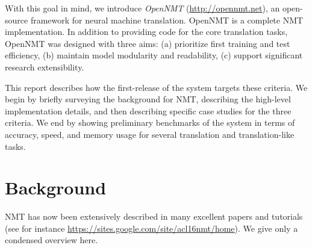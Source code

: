 \documentclass[11pt]{article}
\begin{document}
With this goal in mind, we introduce \textit{OpenNMT} (\url{http://opennmt.net}), an open-source framework
for neural machine translation. OpenNMT is a complete NMT
implementation. In addition to providing code for the core translation
tasks, OpenNMT was designed with three aims:
(a) prioritize first training and test efficiency, (b) maintain model modularity and readability, (c) support significant research extensibility.

This report describes how the first-release of the
system targets these criteria. We begin by briefly surveying the
background for NMT, describing the high-level implementation details,
and then describing specific case studies for the three criteria.  We
end by showing preliminary benchmarks of the system in terms of
accuracy, speed, and memory usage for several translation and
translation-like tasks.








\section{Background}

NMT has now been extensively described in many
excellent papers and tutorials (see for instance
\url{https://sites.google.com/site/acl16nmt/home}). We give
only a condensed overview here. 
\end{document}
